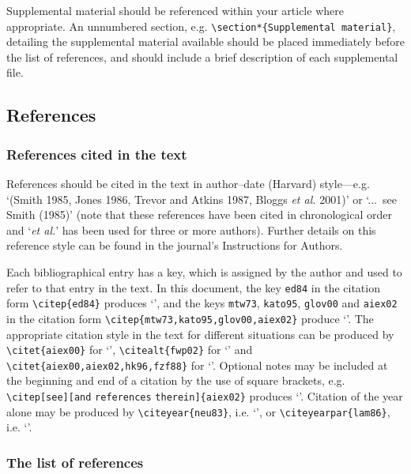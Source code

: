 \documentclass{rQUF2e}
\theoremstyle{plain}
\theoremstyle{definition}
\theoremstyle{remark}
\begin{document}
Supplemental material should be referenced within your article where appropriate. An unnumbered section, e.g. \verb"\section*{Supplemental material}", detailing the supplemental material available should be placed immediately before the list of references, and should include a brief description of each supplemental file.


\subsection{References}\label{refs}

\subsubsection{References cited in the text}

References should be cited in the text in  author--date (Harvard) style---e.g. `(Smith 1985, Jones 1986, Trevor and Atkins 1987, Bloggs
{\itshape{et al.}} 2001)' or `...~see Smith (1985)' (note that these references have been cited in
chronological order and `{\itshape{et al.}}' has been used for three or more authors).
Further details on this reference style can be found in the journal's Instructions for Authors.

Each bibliographical entry has a key, which is assigned by the author and used to refer
to that entry in the text. In this document, the key \verb"ed84" in the citation form \verb"\citep{ed84}"
produces `\citep{ed84}', and the keys \verb"mtw73", \verb"kato95", \verb"glov00" and \verb"aiex02" in the citation
form \verb"\citep{mtw73,kato95,glov00,aiex02}" produce `\citep{mtw73,kato95,glov00,aiex02}'. The appropriate
citation style in the text for different situations can be produced by \verb"\citet{aiex00}" for
`\citet{aiex00}', \verb"\citealt{fwp02}" for `\citealt{fwp02}' and \verb"\citet{aiex00,aiex02,hk96,fzf88}" for
`\citet{aiex00,aiex02,hk96,fzf88}'. Optional notes may be included at the beginning and end of a citation by the
use of square brackets, e.g. \verb"\citep[see][and" \verb"references" \verb"therein]{aiex02}" produces
`\citep[see][and references therein]{aiex02}'. Citation of the year alone may be produced by
\verb"\citeyear{neu83}", i.e. `\citeyear{neu83}', or \verb"\citeyearpar{lam86}", i.e. `\citeyearpar{lam86}'.

\subsubsection{The list of references}
\end{document}
